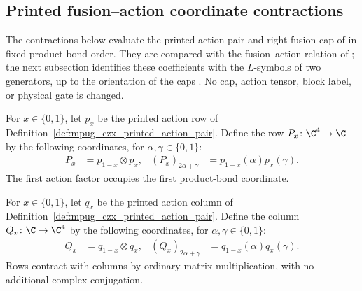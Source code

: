 \subsection{Printed fusion--action coordinate contractions}

The contractions below evaluate the printed action pair and right fusion
cap of \cite[lines~4671--4694]{FrancoRubio2025MPUGauging} in fixed product-bond
order. They are compared with the fusion--action relation of
\cite[lines~1875--1913]{FrancoRubio2025MPUGauging}; the next subsection
identifies these coefficients with the $L$-symbols of two generators, up to the
orientation of the caps \cite{gap:fbc25_czx_fusion_coordinate_compatibility}.
No cap, action tensor, block label, or physical gate is changed.

\begin{definition}
    \label{def:mpug_czx_sequential_action_bra}
    \leanok
    For $x\in\{0,1\}$, let $p_x$ be the printed action row of
    Definition~\ref{def:mpug_czx_printed_action_pair}. Define the row
    $P_x\colon\C^4\to\C$ by the following coordinates, for
    $\alpha,\gamma\in\{0,1\}$:
    \begin{align}
        P_x                    & =p_{1-x}\otimes p_x,         &
        (P_x)_{2\alpha+\gamma} & =p_{1-x}(\alpha)p_x(\gamma).
    \end{align}
    The first action factor occupies the first product-bond coordinate.
\end{definition}

\begin{definition}
    \label{def:mpug_czx_sequential_action_ket}
    \leanok
    For $x\in\{0,1\}$, let $q_x$ be the printed action column of
    Definition~\ref{def:mpug_czx_printed_action_pair}. Define the column
    $Q_x\colon\C\to\C^4$ by the following coordinates, for
    $\alpha,\gamma\in\{0,1\}$:
    \begin{align}
        Q_x                    & =q_{1-x}\otimes q_x,         &
        (Q_x)_{2\alpha+\gamma} & =q_{1-x}(\alpha)q_x(\gamma).
    \end{align}
    Rows contract with columns by ordinary matrix multiplication, with no
    additional complex conjugation.
\end{definition}

